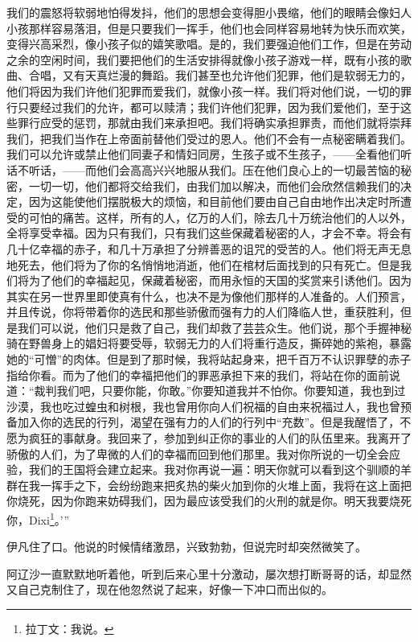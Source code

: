 我们的震怒将软弱地怕得发抖，他们的思想会变得胆小畏缩，他们的眼睛会像妇人小孩那样容易落泪，但是只要我们一挥手，他们也会同样容易地转为快乐而欢笑，变得兴高采烈，像小孩子似的嬉笑歌唱。是的，我们要强迫他们工作，但是在劳动之余的空闲时间，我们要把他们的生活安排得就像小孩子游戏一样，既有小孩的歌曲、合唱，又有天真烂漫的舞蹈。我们甚至也允许他们犯罪，他们是软弱无力的，他们将因为我们许他们犯罪而爱我们，就像小孩一样。我们将对他们说，一切的罪行只要经过我们的允许，都可以赎清；我们许他们犯罪，因为我们爱他们，至于这些罪行应受的惩罚，那就由我们来承担吧。我们将确实承担罪责，而他们就将崇拜我们，把我们当作在上帝面前替他们受过的恩人。他们不会有一点秘密瞒着我们。我们可以允许或禁止他们同妻子和情妇同房，生孩子或不生孩子，——全看他们听话不听话，——而他们会高高兴兴地服从我们。压在他们良心上的一切最苦恼的秘密，一切一切，他们都将交给我们，由我们加以解决，而他们会欣然信赖我们的决定，因为这能使他们摆脱极大的烦恼，和目前他们要由自己自由地作出决定时所遭受的可怕的痛苦。这样，所有的人，亿万的人们，除去几十万统治他们的人以外，全将享受幸福。因为只有我们，只有我们这些保藏着秘密的人，才会不幸。将会有几十亿幸福的赤子，和几十万承担了分辨善恶的诅咒的受苦的人。他们将无声无息地死去，他们将为了你的名悄悄地消逝，他们在棺材后面找到的只有死亡。但是我们将为了他们的幸福起见，保藏着秘密，而用永恒的天国的奖赏来引诱他们。因为其实在另一世界里即使真有什么，也决不是为像他们那样的人准备的。人们预言，并且传说，你将带着你的选民和那些骄傲而强有力的人们降临人世，重获胜利，但是我们可以说，他们只是救了自己，我们却救了芸芸众生。他们说，那个手握神秘骑在野兽身上的娼妇将要受辱，软弱无力的人们将重行造反，撕碎她的紫袍，暴露她的“可憎”的肉体。但是到了那时候，我将站起身来，把千百万不认识罪孽的赤子指给你看。而为了他们的幸福把他们的罪恶承担下来的我们，将站在你的面前说道：“裁判我们吧，只要你能，你敢。”你要知道我并不怕你。你要知道，我也到过沙漠，我也吃过蝗虫和树根，我也曾用你向人们祝福的自由来祝福过人，我也曾预备加入你的选民的行列，渴望在强有力的人们的行列中“充数”。但是我醒悟了，不愿为疯狂的事献身。我回来了，参加到纠正你的事业的人们的队伍里来。我离开了骄傲的人们，为了卑微的人们的幸福而回到他们那里。我对你所说的一切全会应验，我们的王国将会建立起来。我对你再说一遍：明天你就可以看到这个驯顺的羊群在我一挥手之下，会纷纷跑来把炙热的柴火加到你的火堆上面，我将在这上面把你烧死，因为你跑来妨碍我们，因为最应该受我们的火刑的就是你。明天我要烧死你，Dixi\footnote{拉丁文：我说。}。’”
\par 伊凡住了口。他说的时候情绪激昂，兴致勃勃，但说完时却突然微笑了。
\par 阿辽沙一直默默地听着他，听到后来心里十分激动，屡次想打断哥哥的话，却显然又自己克制住了，现在他忽然说了起来，好像一下冲口而出似的。
